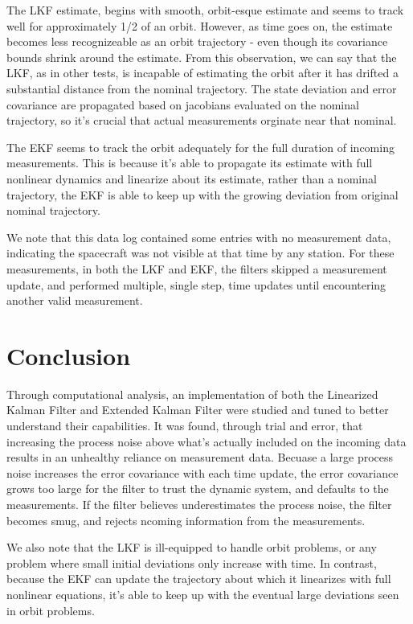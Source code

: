 \documentclass[11pt, a4paper]{article}
\begin{document}
The LKF estimate, begins with smooth, orbit-esque estimate and seems to track well for approximately 1/2 of an orbit. 
However, as time goes on, the estimate becomes less recognizeable as an orbit trajectory - even though its covariance bounds shrink around the estimate.
From this observation, we can say that the LKF, as in other tests, is incapable of estimating the orbit after it has drifted a substantial distance from the nominal trajectory. 
The state deviation and error covariance are propagated based on jacobians evaluated on the nominal trajectory, so it's crucial that actual measurements orginate near that nominal. 

The EKF seems to track the orbit adequately for the full duration of incoming measurements. 
This is because it's able to propagate its estimate with full nonlinear dynamics and linearize about its estimate, rather than a nominal trajectory, 
the EKF is able to keep up with the growing deviation from original nominal trajectory. 

We note that this data log contained some entries with no measurement data, indicating the spacecraft was not visible at that time by any station. 
For these measurements, in both the LKF and EKF, the filters skipped a measurement update, and performed multiple, single step, time updates until encountering another valid measurement.  

\section{Conclusion}
Through computational analysis, an implementation of both the Linearized Kalman Filter and Extended Kalman Filter were studied and tuned to better understand their capabilities. 
It was found, through trial and error, that increasing the process noise above what's actually included on the incoming data results in an unhealthy reliance on measurement data. 
Becuase a large process noise increases the error covariance with each time update, the error covariance grows too large for the filter to trust the dynamic system, and defaults to the measurements. 
If the filter believes underestimates the process noise, the filter becomes smug, and rejects ncoming information from the measurements. 

We also note that the LKF is ill-equipped to handle orbit problems, or any problem where small initial deviations only increase with time.
In contrast, because the EKF can update the trajectory about which it linearizes with full nonlinear equations, it's able to keep up with the eventual large deviations seen in orbit problems.  
\end{document}
